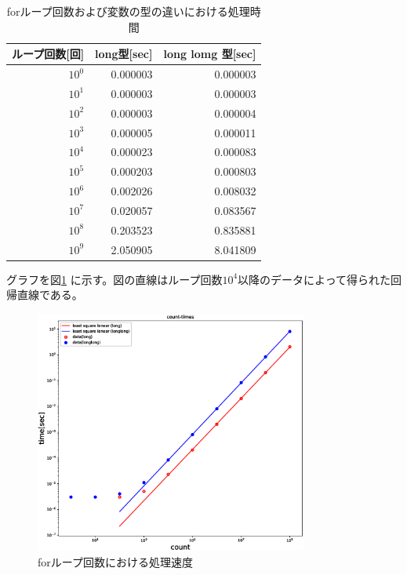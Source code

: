 \documentclass{jarticle}
\begin{document}
\begin{table}[h]
   \begin{center}

       \caption{forループ回数および変数の型の違いにおける処理時間}
        \begin{tabular}{|r|r|r|}
         \hline
         ループ回数[回] & long型[sec] & long lomg 型[sec]\\
         \hline
         $10^0$ & 0.000003  & 0.000003 \\
         $10^1$ & 0.000003  & 0.000003 \\
         $10^2$ & 0.000003  & 0.000004 \\
         $10^3$ & 0.000005  & 0.000011 \\
         $10^4$ & 0.000023  & 0.000083 \\
         $10^5$ & 0.000203  & 0.000803 \\
         $10^6$ & 0.002026  & 0.008032 \\
         $10^7$ & 0.020057  & 0.083567 \\
         $10^8$ & 0.203523  & 0.835881 \\
         $10^9$ & 2.050905  & 8.041809 \\
         \hline
        \end{tabular}
       \label{table:Cs137}

   \end{center}
  \end{table}
  
  グラフを図\ref{fig:fig2} に示す。図の直線はループ回数$10^4$以降のデータによって得られた回帰直線である。
  
\begin{figure}[ht]
\includegraphics[width=0.8\textwidth]{fig/fig2.eps}
\caption{forループ回数における処理速度}
\label{fig:fig2}
\end{figure}
\end{document}
